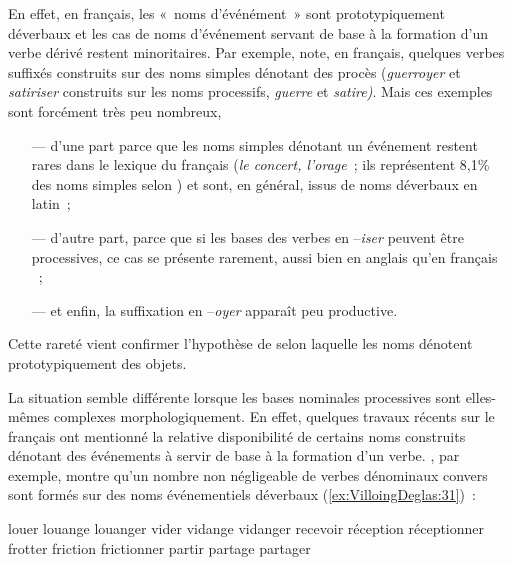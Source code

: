 \documentclass[output=paper]{langsci/langscibook}
\begin{document}
En effet, en français, les «~noms d'événément~» sont prototypiquement
déverbaux et les cas de noms d'événement servant de base à la formation
d'un verbe dérivé restent minoritaires. Par exemple, %
\citet{corbin04} %
%
note,
en français, quelques verbes suffixés construits sur des noms simples
dénotant des procès (\emph{guerroyer} et \emph{satiriser} construits sur
les noms processifs, \emph{guerre} et \emph{satire)}. Mais ces exemples
sont forcément très peu nombreux,

\begin{itemize}
\item[---] d'une part parce que les noms simples dénotant un événement restent
rares dans le lexique du français (\emph{le concert, l'orage}~; ils
représentent 8,1\% des noms simples selon %
\citealt{Tribout2014}%
%
)
et sont, en général, issus de noms déverbaux en latin~;

\item[---] d'autre part, parce que si les bases des verbes en --\emph{iser}
peuvent être processives, ce cas se présente rarement, aussi bien en
anglais %
\citep{Plag1999} %
%
qu'en français %
\citep{namer2013}%
%
~;

\item[---] et enfin, la suffixation en --\emph{oyer} apparaît peu productive.
\end{itemize}

Cette rareté vient confirmer l'hypothèse de %
\citet{Croft91} %
%
selon laquelle
les noms dénotent prototypiquement des objets.

La situation semble  différente lorsque les bases nominales processives
sont elles-mêmes complexes morphologiquement. En effet, quelques travaux
récents sur le français ont mentionné la relative disponibilité de
certains noms construits dénotant des événements à servir de base à la
formation d'un verbe. %
\citet{Tribout2010a}%
%
, par exemple, montre qu'un nombre
non négligeable de verbes dénominaux convers sont formés sur des noms
événementiels déverbaux (\ref{ex:VilloingDeglas:31})~:

\ea \label{ex:VilloingDeglas:31}
  \ea\label{ex:VilloingDeglas:31a} louer \textrightarrow{~} louange \textrightarrow{~} louanger
  \ex\label{ex:VilloingDeglas:31b} vider \textrightarrow{~} vidange \textrightarrow{~} vidanger
  \ex\label{ex:VilloingDeglas:31c} recevoir \textrightarrow{~} réception \textrightarrow{~} réceptionner
  \ex\label{ex:VilloingDeglas:31d} frotter \textrightarrow{~} friction \textrightarrow{~} frictionner
  \ex\label{ex:VilloingDeglas:31e} partir \textrightarrow{~} partage \textrightarrow{~} partager
\z\z
\end{document}
